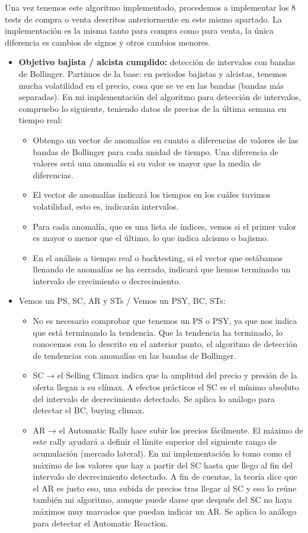 Una vez tenemos este algoritmo implementado, procedemos a implementar los 8 tests de compra o venta descritos anteriormente en este mismo apartado. La implementación es la misma tanto para compra como para venta, la única diferencia es cambios de signos y otros cambios menores.\newline

\begin{itemize}
	\item \textbf{Objetivo bajista / alcista cumplido:} detección de intervalos con bandas de Bollinger. Partimos de la base: en periodos bajistas y alcistas, tenemos mucha volatilidad en el precio, cosa que se ve en las bandas (bandas más separadas). En mi implementación del algoritmo para detección de intervalos, compruebo lo siguiente, teniendo datos de precios de la última semana en tiempo real:
	\begin{itemize}
		\item Obtengo un vector de anomalías en cuanto a diferencias de valores de las bandas de Bollinger para cada unidad de tiempo. Una diferencia de valores será una anomalía si su valor es mayor que la media de diferencias.
		\item El vector de anomalías indicará los tiempos en los cuáles tuvimos volatilidad, esto es, indicarán intervalos. 
		\item Para cada anomalía, que es una lista de índices, vemos si el primer valor es mayor o menor que el último, lo que indica alcismo o bajismo.
		\item En el análisis a tiempo real o backtesting, si el vector que estábamos llenando de anomalías se ha cerrado, indicará que hemos terminado un intervalo de crecimiento o decrecimiento.
	\end{itemize}
	\item Vemos un PS, SC, AR y STs / Vemos un PSY, BC, STs:
	\begin{itemize}
		\item No es necesario comprobar que tenemos un PS o PSY, ya que nos indica que está terminando la tendencia. Que la tendencia ha terminado, lo conocemos con lo descrito en el anterior punto, el algoritmo de detección de tendencias con anomalías en las bandas de Bollinger.
		\item SC → el Selling Climax indica que la amplitud del precio y presión de la oferta llegan a su clímax. A efectos prácticos el SC es el mínimo absoluto del intervalo de decrecimiento detectado. Se aplica lo análogo para detectar el BC, buying climax.
		\item AR → el Automatic Rally hace subir los precios fácilmente. El máximo de este rally ayudará a definir el límite superior del siguiente rango de acumulación (mercado lateral). En mi implementación lo tomo como el máximo de los valores que hay a partir del SC hasta que llego al fin del intervalo de decrecimiento detectado. A fin de cuentas, la teoría dice que el AR es justo eso, una subida de precios tras llegar al SC y eso lo reúne también mi algoritmo, aunque puede darse que después del SC no haya máximos muy marcados que puedan indicar un AR. Se aplica lo análogo para detectar el Automatic Reaction.

\end{itemize}
\end{itemize}
